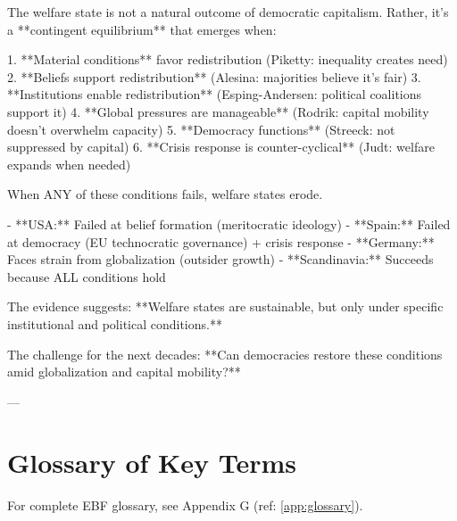 The welfare state is not a natural outcome of democratic capitalism. Rather, it's a **contingent equilibrium** that emerges when:

1. **Material conditions** favor redistribution (Piketty: inequality creates need)
2. **Beliefs support redistribution** (Alesina: majorities believe it's fair)
3. **Institutions enable redistribution** (Esping-Andersen: political coalitions support it)
4. **Global pressures are manageable** (Rodrik: capital mobility doesn't overwhelm capacity)
5. **Democracy functions** (Streeck: not suppressed by capital)
6. **Crisis response is counter-cyclical** (Judt: welfare expands when needed)

When ANY of these conditions fails, welfare states erode.

- **USA:** Failed at belief formation (meritocratic ideology)
- **Spain:** Failed at democracy (EU technocratic governance) + crisis response
- **Germany:** Faces strain from globalization (outsider growth)
- **Scandinavia:** Succeeds because ALL conditions hold

The evidence suggests: **Welfare states are sustainable, but only under specific institutional and political conditions.**

The challenge for the next decades: **Can democracies restore these conditions amid globalization and capital mobility?**

---

\clearpage


\section{Glossary of Key Terms}
\label{sec:glossary}

For complete EBF glossary, see Appendix G (ref: \ref{app:glossary}).

